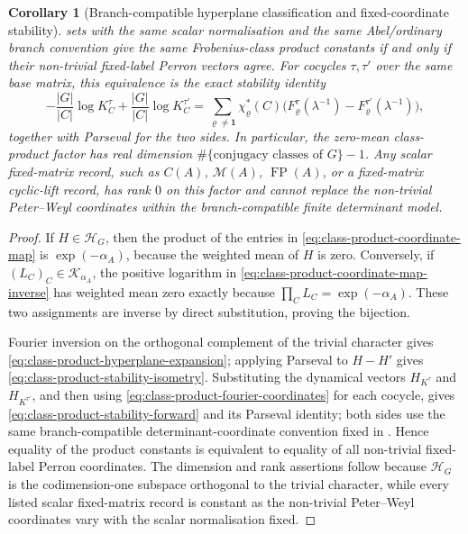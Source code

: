 \documentclass[11pt,a4paper]{amsart}
\theoremstyle{plain}
\newtheorem{corollary}[theorem]{Corollary}
\theoremstyle{definition}
\theoremstyle{remark}
\DeclareMathOperator{\FP}{FP}
\begin{document}
\begin{corollary}[Branch-compatible hyperplane classification and fixed-coordinate stability]
  sets with the same scalar normalisation and the same Abel/ordinary branch
  convention give the same Frobenius-class product constants if and only if
  their non-trivial fixed-label Perron vectors agree.
  For cocycles \(\tau,\tau'\) over the same base matrix, this equivalence is
  the exact stability identity
  \begin{equation}\label{eq:class-product-stability-forward}
    -\frac{|G|}{|C|}\log K_C^\tau
    +\frac{|G|}{|C|}\log K_C^{\tau'}
    =
    \sum_{\varrho\neq\mathbf1}
      \chi_\varrho^\ast(C)
      \bigl(F_\varrho^\tau(\lambda^{-1})
            -F_\varrho^{\tau'}(\lambda^{-1})\bigr),
  \end{equation}
  together with Parseval for the two sides.  In particular, the zero-mean
  class-product factor has real dimension
  \(\#\{\text{conjugacy classes of }G\}-1\).  Any scalar fixed-matrix
  record, such as \(C(A)\), \(\mathcal M(A)\), \(\FP(A)\), or a fixed-matrix
  cyclic-lift record, has rank \(0\) on this factor and cannot replace the
  non-trivial Peter--Weyl coordinates within the branch-compatible finite
  determinant model.
\end{corollary}

\begin{proof}
  If \(H\in\mathcal H_G\), then the product of the entries in
  \eqref{eq:class-product-coordinate-map} is \(\exp(-\alpha_A)\), because the
  weighted mean of \(H\) is zero.  Conversely, if
  \((L_C)_C\in\mathscr K_{\alpha_A}\), the positive logarithm in
  \eqref{eq:class-product-coordinate-map-inverse} has weighted mean zero
  exactly because \(\prod_C L_C=\exp(-\alpha_A)\).  These two assignments are
  inverse by direct substitution, proving the bijection.

  Fourier inversion on the orthogonal complement of the trivial character gives
  \eqref{eq:class-product-hyperplane-expansion}; applying Parseval to
  \(H-H'\) gives \eqref{eq:class-product-stability-isometry}.  Substituting
  the dynamical vectors \(H_{K^\tau}\) and \(H_{K^{\tau'}}\), and then using
  \eqref{eq:class-product-fourier-coordinates} for each cocycle, gives
  \eqref{eq:class-product-stability-forward} and its Parseval identity; both
  sides use the same branch-compatible determinant-coordinate convention
  fixed in .
  Hence equality of the product constants is equivalent to equality of all
  non-trivial fixed-label Perron coordinates.  The dimension and rank
  assertions follow because \(\mathcal H_G\) is the codimension-one subspace
  orthogonal to the trivial character, while every listed scalar fixed-matrix
  record is constant as the non-trivial Peter--Weyl coordinates vary with the
  scalar normalisation fixed.
\end{proof}
\end{document}
